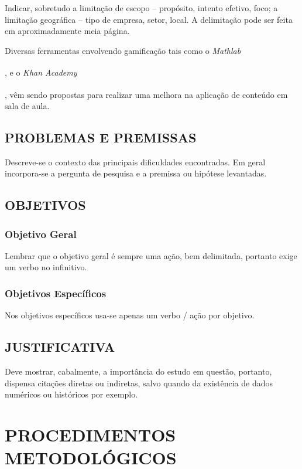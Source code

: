 \documentclass[
	12pt,				%
	openright,			%
	oneside,			%
	a4paper,			%
	chapter=TITLE,		%
	english,			%
	french,				%
	spanish,			%
	brazil				%
	]{abntex2}
\begin{document}
Indicar, sobretudo a limitação de escopo – propósito, intento efetivo, foco; a limitação geográfica – tipo de empresa, setor, local. A delimitação pode ser feita em aproximadamente meia página.  

Diversas ferramentas envolvendo gamificação tais como o \textit{Mathlab}{\textsuperscript{\textcopyright}, e o \textit{Khan Academy}{\textsuperscript{\textcopyright} \cite{Marchetto2016}, vêm sendo propostas para realizar uma melhora na aplicação de conteúdo em sala de aula.

\section[PROBLEMAS E PREMISSAS]{PROBLEMAS E PREMISSAS}

Descreve-se o contexto das principais dificuldades encontradas. Em geral incorpora-se a pergunta de pesquisa e a premissa ou hipótese levantadas.

\section[OBJETIVOS]{OBJETIVOS}

\subsection[Objetivo Geral]{Objetivo Geral}

Lembrar que o objetivo geral é sempre uma ação, bem delimitada, portanto exige um verbo no infinitivo.


\subsection[Objetivos Específicos]{Objetivos Específicos}

 Nos objetivos específicos usa-se apenas um verbo / ação por objetivo.

\section[JUSTIFICATIVA]{JUSTIFICATIVA}

Deve mostrar, cabalmente, a importância do estudo em questão, portanto, dispensa citações diretas ou indiretas, salvo quando da existência de dados numéricos ou históricos por exemplo.



{\vspace{5em}\let\clearpage\relax \chapter[PROCEDIMENTOS METODOLÓGICOS]{\textbf{PROCEDIMENTOS METODOLÓGICOS}}}

}}
\end{document}
